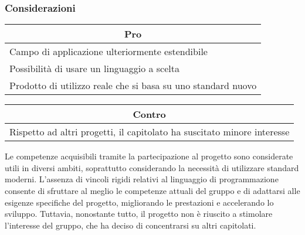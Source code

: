 \subsubsection{Considerazioni}
\begin{minipage}[t]{0.45\linewidth}
    \vspace{0pt}
    {\renewcommand{\arraystretch}{1.5}
    \begin{tabular}{p{1\linewidth}}
        \multicolumn{1}{c}{\textbf{Pro}} \\
        \midrule
        Campo di applicazione ulteriormente estendibile \\
        Possibilità di usare un linguaggio a scelta \\
        Prodotto di utilizzo reale che si basa su uno standard nuovo \\
        \hline
    \end{tabular}
    }
\end{minipage}
\hspace{0.05\linewidth}
\begin{minipage}[t]{0.45\linewidth}
    \vspace{0pt}
    {\renewcommand{\arraystretch}{1.5}
    \begin{tabular}{p{1\linewidth}}
        \multicolumn{1}{c}{\textbf{Contro}} \\
        \midrule
        Rispetto ad altri progetti, il capitolato ha suscitato minore interesse \\
        \hline
    \end{tabular}
    }
\end{minipage}
\vspace{1em}

Le competenze acquisibili tramite la partecipazione al progetto sono considerate utili in diversi ambiti, soprattutto considerando la necessità di utilizzare standard moderni.
L'assenza di vincoli rigidi relativi al linguaggio di programmazione consente di sfruttare al meglio le competenze attuali del gruppo e di adattarsi alle esigenze specifiche del progetto, migliorando le prestazioni e accelerando lo sviluppo.
Tuttavia, nonostante tutto, il progetto non è riuscito a stimolare l'interesse del gruppo, che ha deciso di concentrarsi su altri capitolati.